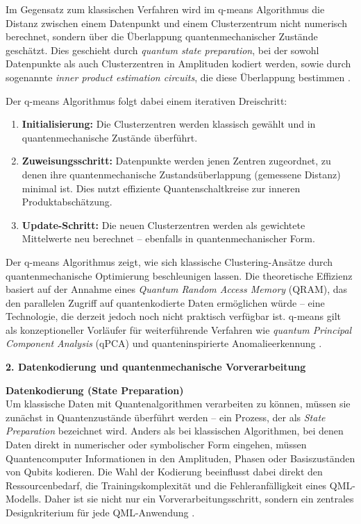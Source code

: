Im Gegensatz zum klassischen Verfahren wird im q-means Algorithmus die Distanz zwischen einem Datenpunkt und einem Clusterzentrum nicht numerisch berechnet, sondern über die Überlappung quantenmechanischer Zustände geschätzt. Dies geschieht durch \textit{quantum state preparation}, bei der sowohl Datenpunkte als auch Clusterzentren in Amplituden kodiert werden, sowie durch sogenannte \textit{inner product estimation circuits}, die diese Überlappung bestimmen \cite{kerenidis2019}.  

Der q-means Algorithmus folgt dabei einem iterativen Dreischritt:  
\begin{enumerate}
  \item \textbf{Initialisierung:} Die Clusterzentren werden klassisch gewählt und in quantenmechanische Zustände überführt.
  \item \textbf{Zuweisungsschritt:} Datenpunkte werden jenen Zentren zugeordnet, zu denen ihre quantenmechanische Zustandsüberlappung (gemessene Distanz) minimal ist. Dies nutzt effiziente Quantenschaltkreise zur inneren Produktabschätzung.
  \item \textbf{Update-Schritt:} Die neuen Clusterzentren werden als gewichtete Mittelwerte neu berechnet – ebenfalls in quantenmechanischer Form.
\end{enumerate}  

Der q-means Algorithmus zeigt, wie sich klassische Clustering-Ansätze durch quantenmechanische Optimierung beschleunigen lassen. Die theoretische Effizienz basiert auf der Annahme eines \textit{Quantum Random Access Memory} (QRAM), das den parallelen Zugriff auf quantenkodierte Daten ermöglichen würde – eine Technologie, die derzeit jedoch noch nicht praktisch verfügbar ist. q-means gilt als konzeptioneller Vorläufer für weiterführende Verfahren wie \textit{quantum Principal Component Analysis} (qPCA) und quanteninspirierte Anomalieerkennung \cite{kerenidis2019}.  

\vspace{0.5cm}
\noindent\textbf{2. Datenkodierung und quantenmechanische Vorverarbeitung}  

\noindent
\textbf{Datenkodierung (State Preparation)}\\
Um klassische Daten mit Quantenalgorithmen verarbeiten zu können, müssen sie zunächst in Quantenzustände überführt werden – ein Prozess, der als \textit{State Preparation} bezeichnet wird. Anders als bei klassischen Algorithmen, bei denen Daten direkt in numerischer oder symbolischer Form eingehen, müssen Quantencomputer Informationen in den Amplituden, Phasen oder Basiszuständen von Qubits kodieren. Die Wahl der Kodierung beeinflusst dabei direkt den Ressourcenbedarf, die Trainingskomplexität und die Fehleranfälligkeit eines QML-Modells. Daher ist sie nicht nur ein Vorverarbeitungsschritt, sondern ein zentrales Designkriterium für jede QML-Anwendung \cite{schuld2018}.  

